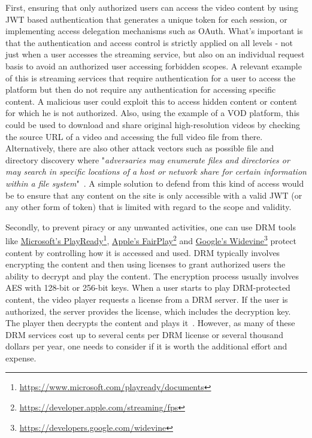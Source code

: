 First, ensuring that only authorized users can access the video content by using \ac{JWT} based authentication that generates a unique token for each session, or implementing access delegation mechanisms such as OAuth. What's important is that the authentication and access control is strictly applied on all levels - not just when a user accesses the streaming service, but also on an individual request basis to avoid an authorized user accessing forbidden scopes. A relevant example of this is streaming services that require authentication for a user to access the platform but then do not require any authentication for accessing specific content. A malicious user could exploit this to access hidden content or content for which he is not authorized. Also, using the example of a \ac{VOD} platform, this could be used to download and share original high-resolution videos by checking the source URL of a video and accessing the full video file from there.
Alternatively, there are also other attack vectors such as possible file and directory discovery where "\textit{adversaries may enumerate files and directories or may search in specific locations of a host or network share for certain information within a file system}"~\parencite{mitre}. A simple solution to defend from this kind of access would be to ensure that any content on the site is only accessible with a valid \ac{JWT} (or any other form of token) that is limited with regard to the scope and validity.

Secondly, to prevent piracy or any unwanted activities, one can use \ac{DRM} tools like \href{https://www.microsoft.com/playready/documents}{Microsoft's PlayReady}\footnote{\url{https://www.microsoft.com/playready/documents}}, \href{https://developer.apple.com/streaming/fps}{Apple's FairPlay}\footnote{\url{https://developer.apple.com/streaming/fps}} and \href{https://developers.google.com/widevine}{Google's Widevine}\footnote{\url{https://developers.google.com/widevine}} protect content by controlling how it is accessed and used. \ac{DRM} typically involves encrypting the content and then using licenses to grant authorized users the ability to decrypt and play the content. The encryption process usually involves \ac{AES} with 128-bit or 256-bit keys. When a user starts to play \ac{DRM}-protected content, the video player requests a license from a \ac{DRM} server. If the user is authorized, the server provides the license, which includes the decryption key. The player then decrypts the content and plays it~\parencite{drm}. However, as many of these \ac{DRM} services cost up to several cents per \ac{DRM} license or several thousand dollars per year, one needs to consider if it is worth the additional effort and expense.

